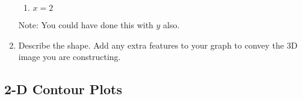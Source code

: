 \begin{problem}
\begin{enumerate}
\begin{enumerate}
		\item $x=2$
	\end{enumerate}
	Note: You could have done this with $y$ also. 
	\item Describe the shape. Add any extra features to your graph to convey the 3D image you are constructing. 
\end{enumerate}
\end{problem}

\subsection{2-D Contour Plots}


